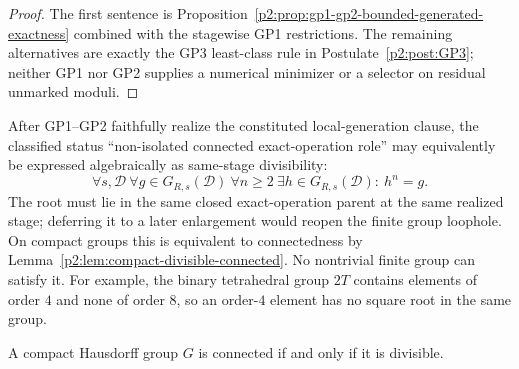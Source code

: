 \documentclass[12pt,a4paper]{article}
\begin{document}
\begin{proof}
The first sentence is Proposition~\ref{p2:prop:gp1-gp2-bounded-generated-exactness}
combined with the stagewise GP1 restrictions.  The remaining alternatives
are exactly the GP3 least-class rule in
Postulate~\ref{p2:post:GP3}; neither GP1 nor GP2 supplies a
numerical minimizer or a selector on residual unmarked moduli.
\end{proof}

\begin{remark}
\label{p2:rem:divisibility-signature}
After GP1--GP2 faithfully realize the constituted local-generation clause, the
classified status ``non-isolated connected exact-operation role'' may
equivalently be expressed algebraically as
same-stage divisibility:
\[
 \forall s,\mathcal D\ \forall g\in G_{R,s}(\mathcal D)\
 \forall n\ge2\ \exists h\in G_{R,s}(\mathcal D):\ h^n=g.
\]
The root must lie in the same closed exact-operation parent at the same
realized stage; deferring it to a later enlargement would reopen the finite
group loophole.  On compact groups this is equivalent to connectedness by
Lemma~\ref{p2:lem:compact-divisible-connected}.  No nontrivial finite group
can satisfy it.  For example, the binary tetrahedral group \(2T\) contains elements of
order \(4\) and none of order \(8\), so an order-\(4\) element has no square
root in the same group.
\end{remark}

\begin{lemma}
\label{p2:lem:compact-divisible-connected}
A compact Hausdorff group \(G\) is connected if and only if it is divisible.
\end{lemma}
\end{document}
